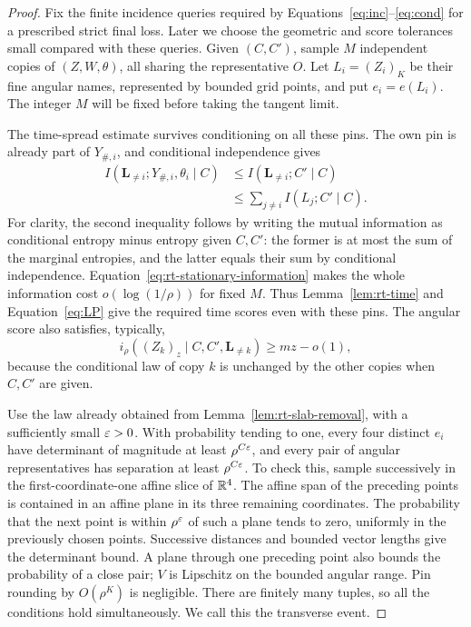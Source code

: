\begin{proof}
Fix the finite incidence queries required by
Equations~\eqref{eq:inc}--\eqref{eq:cond} for a prescribed strict
final loss.  Later we choose the geometric and score tolerances
small compared with these queries.  Given $(C,C')$, sample $M$
independent copies of $(Z,W,\theta)$, all sharing the
representative $O$.  Let $L_i=(Z_i)_K$ be their fine angular
names, represented by bounded grid points, and put $e_i=e(L_i)$.
The integer $M$ will be fixed before taking the tangent limit.

The time-spread estimate survives conditioning on all these pins.
The own pin is already part of $Y_{\#,i}$, and conditional
independence gives
\begin{align*}
 I(\mathbf L_{\ne i};Y_{\#,i},\theta_i\mid C)
 &\le I(\mathbf L_{\ne i};C'\mid C)\\
 &\le\sum_{j\ne i}I(L_j;C'\mid C).
\end{align*}
For clarity, the second inequality follows by writing the mutual
information as conditional entropy minus entropy given $C,C'$:
the former is at most the sum of the marginal entropies, and the
latter equals their sum by conditional independence.
Equation~\eqref{eq:rt-stationary-information} makes the whole
information cost $o(\log(1/\rho))$ for fixed $M$.
Thus Lemma~\ref{lem:rt-time} and Equation~\eqref{eq:LP} give
the required time scores even with these pins.  The angular score
also satisfies, typically,
\begin{equation}\label{eq:rt-product-angular}
 i_\rho((Z_k)_z\mid C,C',\mathbf L_{\ne k})\ge mz-o(1),
\end{equation}
because the conditional law of copy $k$ is unchanged by the other
copies when $C,C'$ are given.

Use the law already obtained from
Lemma~\ref{lem:rt-slab-removal}, with a sufficiently small
$\varepsilon>0$.  With probability tending to one, every four distinct
$e_i$ have determinant of magnitude at least $\rho^{C\varepsilon}$,
and every pair of angular representatives has separation at least
$\rho^{C\varepsilon}$.  To check this, sample successively in the
first-coordinate-one affine slice of $\mathbb R^4$.  The affine span
of the preceding points is contained in an affine plane in its
three remaining coordinates.  The probability that the next
point is within $\rho^\varepsilon$ of such a plane tends to zero,
uniformly in the previously chosen points.  Successive distances
and bounded vector lengths give the determinant bound.  A plane
through one preceding point also bounds the probability of a
close pair; $V$ is Lipschitz on the bounded angular range.
Pin rounding by $O(\rho^K)$ is negligible.  There are finitely
many tuples, so all the conditions hold simultaneously.  We call
this the transverse event.


\end{proof}
